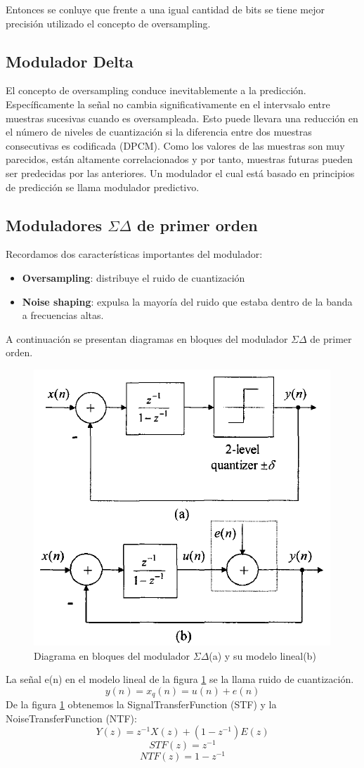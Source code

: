 \documentclass[assd_tp3_main.tex]{subfiles}
\begin{document}
Entonces se conluye que frente a una igual cantidad de bits se tiene mejor precisión utilizado el concepto de oversampling.


\subsection{Modulador Delta}

El concepto de oversampling conduce inevitablemente a la predicción. Específicamente la señal no cambia significativamente en el intervsalo entre muestras sucesivas cuando es oversampleada. Esto puede llevara una reducción en el número de niveles de cuantización si la diferencia entre dos muestras consecutivas es codificada (DPCM). Como los valores de las muestras son muy parecidos, están altamente correlacionados y por tanto, muestras futuras pueden ser predecidas por las anteriores.
Un modulador el cual está basado en principios de predicción se llama modulador predictivo.  





\subsection{Moduladores $\Sigma\Delta$ de primer orden }
Recordamos dos características importantes del modulador:
\begin{itemize}
\item \textbf{Oversampling}: distribuye el ruido de cuantización 
\item \textbf{Noise shaping}: expulsa la mayoría del ruido que estaba dentro de la banda a frecuencias altas. 
\end{itemize}
A continuación se presentan diagramas en bloques del modulador $\Sigma\Delta$ de primer orden.
\begin{figure}[H]
\centering
\includegraphics[width=0.4\linewidth]{images/ej4/sd_linmodel.png}
\caption{Diagrama en bloques del modulador $\Sigma\Delta$(a) y su modelo lineal(b)}
\label{fig:sigmadelmod_model}
\end{figure}
La señal e(n) en el modelo lineal de la figura \ref{fig:sigmadelmod_model} se la llama ruido de cuantización.
\[ y(n)=x_q(n)= u(n)+e(n) \]
De la figura \ref{fig:sigmadelmod_model} obtenemos la SignalTransferFunction (STF) y la NoiseTransferFunction (NTF):
\[ Y(z)= z^{-1}X(z)+(1-z^{-1})E(z) \]
\[ STF(z)= z^{-1} \]
\[ NTF(z)= 1-z^{-1} \]
\end{document}
